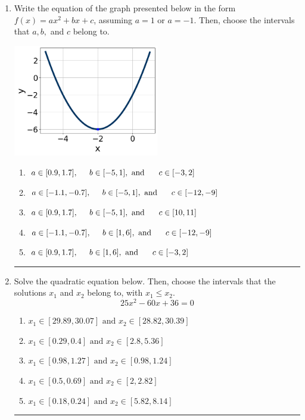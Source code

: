 \documentclass[14pt]{extbook}
\newcommand{\litem}[1]{\item#1\hspace*{-1cm}\rule{\textwidth}{0.4pt}}
\begin{document}
\begin{enumerate}
\litem{
Write the equation of the graph presented below in the form $f(x)=ax^2+bx+c$, assuming  $a=1$ or $a=-1$. Then, choose the intervals that $a, b,$ and $c$ belong to.
\begin{center}
    \includegraphics[width=0.5\textwidth]{../Figures/quadraticGraphToEquationC.png}
\end{center}
\begin{enumerate}[label=\Alph*.]
\item \( a \in [0.9, 1.7], \hspace*{5mm} b \in [-5, 1], \text{ and } \hspace*{5mm} c \in [-3, 2] \)
\item \( a \in [-1.1, -0.7], \hspace*{5mm} b \in [-5, 1], \text{ and } \hspace*{5mm} c \in [-12, -9] \)
\item \( a \in [0.9, 1.7], \hspace*{5mm} b \in [-5, 1], \text{ and } \hspace*{5mm} c \in [10, 11] \)
\item \( a \in [-1.1, -0.7], \hspace*{5mm} b \in [1, 6], \text{ and } \hspace*{5mm} c \in [-12, -9] \)
\item \( a \in [0.9, 1.7], \hspace*{5mm} b \in [1, 6], \text{ and } \hspace*{5mm} c \in [-3, 2] \)

\end{enumerate} }
\litem{
Solve the quadratic equation below. Then, choose the intervals that the solutions $x_1$ and $x_2$ belong to, with $x_1 \leq x_2$.\[ 25x^{2} -60 x + 36 = 0 \]\begin{enumerate}[label=\Alph*.]
\item \( x_1 \in [29.89, 30.07] \text{ and } x_2 \in [28.82, 30.39] \)
\item \( x_1 \in [0.29, 0.4] \text{ and } x_2 \in [2.8, 5.36] \)
\item \( x_1 \in [0.98, 1.27] \text{ and } x_2 \in [0.98, 1.24] \)
\item \( x_1 \in [0.5, 0.69] \text{ and } x_2 \in [2, 2.82] \)
\item \( x_1 \in [0.18, 0.24] \text{ and } x_2 \in [5.82, 8.14] \)


\end{enumerate}}
\end{enumerate}
\end{document}
